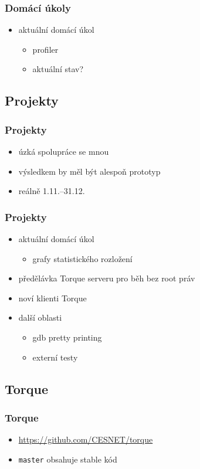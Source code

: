 \begin{frame}
	\frametitle{Domácí úkoly}
	\begin{itemize}
		\item{aktuální domácí úkol}
		\begin{itemize}
			\item{profiler}
			\item{aktuální stav?}
		\end{itemize}
	\end{itemize}
\end{frame}

\subsection{Projekty}

\begin{frame}
	\frametitle{Projekty}
	\begin{itemize}
		\item{úzká spolupráce se mnou}
		\item{výsledkem by měl být alespoň prototyp}
		\item{reálně 1.11.--31.12.}
	\end{itemize}
\end{frame}

\begin{frame}
	\frametitle{Projekty}
	\begin{itemize}
		\item{aktuální domácí úkol}
		\begin{itemize}
			\item{grafy statistického rozložení}
		\end{itemize}
		\item{předělávka Torque serveru pro běh bez root práv}
		\item{noví klienti Torque}
		\item{další oblasti}
		\begin{itemize}
			\item{gdb pretty printing}
			\item{externí testy}
		\end{itemize}
	\end{itemize}
\end{frame}

\subsection{Torque}

\begin{frame}
	\frametitle{Torque}
	\begin{itemize}
		\item{\url{https://github.com/CESNET/torque}}
			\item{\texttt{master} obsahuje stable kód}
	\end{itemize}
\end{frame}




